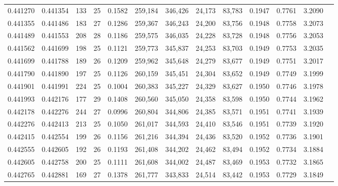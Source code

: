 \begin{tabular}{rrrrrrrrrrrrr}
0.441270 & 0.441354 & 133 &  25 &                                     0.1582 & 259,184 & 346,426 &  24,173 &  83,783 & 0.1947 & 0.7761 & 3.2090 \\
0.441355 & 0.441486 & 183 &  27 &                                     0.1286 & 259,367 & 346,243 &  24,200 &  83,756 & 0.1948 & 0.7758 & 3.2073 \\
0.441489 & 0.441553 & 208 &  28 &                                     0.1186 & 259,575 & 346,035 &  24,228 &  83,728 & 0.1948 & 0.7756 & 3.2053 \\
0.441562 & 0.441699 & 198 &  25 &                                     0.1121 & 259,773 & 345,837 &  24,253 &  83,703 & 0.1949 & 0.7753 & 3.2035 \\
0.441699 & 0.441788 & 189 &  26 &                                     0.1209 & 259,962 & 345,648 &  24,279 &  83,677 & 0.1949 & 0.7751 & 3.2017 \\
0.441790 & 0.441890 & 197 &  25 &                                     0.1126 & 260,159 & 345,451 &  24,304 &  83,652 & 0.1949 & 0.7749 & 3.1999 \\
0.441901 & 0.441991 & 224 &  25 &                                     0.1004 & 260,383 & 345,227 &  24,329 &  83,627 & 0.1950 & 0.7746 & 3.1978 \\
0.441993 & 0.442176 & 177 &  29 &                                     0.1408 & 260,560 & 345,050 &  24,358 &  83,598 & 0.1950 & 0.7744 & 3.1962 \\
0.442178 & 0.442276 & 244 &  27 &                                     0.0996 & 260,804 & 344,806 &  24,385 &  83,571 & 0.1951 & 0.7741 & 3.1939 \\
0.442276 & 0.442413 & 213 &  25 &                                     0.1050 & 261,017 & 344,593 &  24,410 &  83,546 & 0.1951 & 0.7739 & 3.1920 \\
0.442415 & 0.442554 & 199 &  26 &                                     0.1156 & 261,216 & 344,394 &  24,436 &  83,520 & 0.1952 & 0.7736 & 3.1901 \\
0.442555 & 0.442605 & 192 &  26 &                                     0.1193 & 261,408 & 344,202 &  24,462 &  83,494 & 0.1952 & 0.7734 & 3.1884 \\
0.442605 & 0.442758 & 200 &  25 &                                     0.1111 & 261,608 & 344,002 &  24,487 &  83,469 & 0.1953 & 0.7732 & 3.1865 \\
0.442765 & 0.442881 & 169 &  27 &                                     0.1378 & 261,777 & 343,833 &  24,514 &  83,442 & 0.1953 & 0.7729 & 3.1849 \\

\end{tabular}
